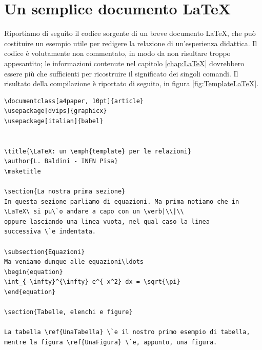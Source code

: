 \chapter{Un semplice documento \LaTeX}

Riportiamo di seguito il codice sorgente di un breve documento
\LaTeX, che pu\`o costituire un esempio utile
per redigere la relazione di un'esperienza didattica.
Il codice \`e volutamente non commentato, in modo da non risultare
troppo appesantito; le informazioni contenute nel capitolo
\ref{chap:LaTeX} dovrebbero essere pi\`u che sufficienti per
ricostruire il significato dei singoli comandi.
Il risultato della compilazione \`e riportato di seguito,
in figura \ref{fig:TemplateLaTeX}.

\begin{verbatim}
\documentclass[a4paper, 10pt]{article}
\usepackage[dvips]{graphicx}
\usepackage[italian]{babel}


\title{\LaTeX: un \emph{template} per le relazioni}
\author{L. Baldini - INFN Pisa}
\maketitle

\section{La nostra prima sezione}
In questa sezione parliamo di equazioni. Ma prima notiamo che in
\LaTeX\ si pu\`o andare a capo con un \verb|\\|\\
oppure lasciando una linea vuota, nel qual caso la linea
successiva \`e indentata.

\subsection{Equazioni}
Ma veniamo dunque alle equazioni\ldots
\begin{equation}
\int_{-\infty}^{\infty} e^{-x^2} dx = \sqrt{\pi}
\end{equation}

\section{Tabelle, elenchi e figure}

La tabella \ref{UnaTabella} \`e il nostro primo esempio di tabella,
mentre la figura \ref{UnaFigura} \`e, appunto, una figura.


\end{verbatim}
